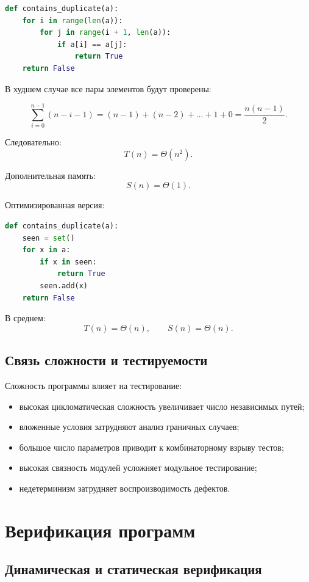 \documentclass[12pt,a4paper]{article}
\begin{document}
\begin{lstlisting}[language=Python]
def contains_duplicate(a):
    for i in range(len(a)):
        for j in range(i + 1, len(a)):
            if a[i] == a[j]:
                return True
    return False
\end{lstlisting}

В худшем случае все пары элементов будут проверены:

\[
\sum_{i=0}^{n-1}(n-i-1)
=
(n-1)+(n-2)+\dots+1+0
=
\frac{n(n-1)}{2}.
\]

Следовательно:
\[
T(n)=\Theta(n^2).
\]

Дополнительная память:
\[
S(n)=\Theta(1).
\]

Оптимизированная версия:

\begin{lstlisting}[language=Python]
def contains_duplicate(a):
    seen = set()
    for x in a:
        if x in seen:
            return True
        seen.add(x)
    return False
\end{lstlisting}

В среднем:
\[
T(n)=\Theta(n),
\qquad
S(n)=\Theta(n).
\]

\subsection{Связь сложности и тестируемости}

Сложность программы влияет на тестирование:

\begin{itemize}
    \item высокая цикломатическая сложность увеличивает число независимых путей;
    \item вложенные условия затрудняют анализ граничных случаев;
    \item большое число параметров приводит к комбинаторному взрыву тестов;
    \item высокая связность модулей усложняет модульное тестирование;
    \item недетерминизм затрудняет воспроизводимость дефектов.
\end{itemize}

\section{Верификация программ}

\subsection{Динамическая и статическая верификация}
\end{document}
